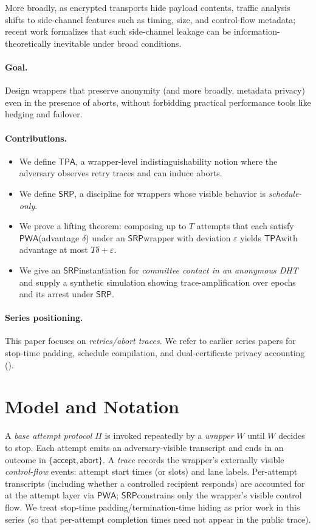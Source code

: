 \documentclass[11pt]{article}
\newcommand{\PWA}{\ensuremath{\mathsf{PWA}}}
\newcommand{\TPA}{\ensuremath{\mathsf{TPA}}}
\newcommand{\SRP}{\ensuremath{\mathsf{SRP}}}
\begin{document}
More broadly, as encrypted transports hide payload contents, traffic analysis shifts to side-channel features such as timing, size, and control-flow metadata; recent work formalizes that such side-channel leakage can be information-theoretically inevitable under broad conditions.\cite{liuInevitabilitySideChannel2026}

\paragraph{Goal.}
Design wrappers that preserve anonymity (and more broadly, metadata privacy) even in the presence of aborts,
without forbidding practical performance tools like hedging and failover.

\paragraph{Contributions.}
\begin{itemize}[leftmargin=*]
  \item We define \TPA, a wrapper-level indistinguishability notion where the adversary observes retry traces and can induce aborts.
  \item We define \SRP, a discipline for wrappers whose visible behavior is \emph{schedule-only}.
  \item We prove a lifting theorem: composing up to $T$ attempts that each satisfy \PWA (advantage $\delta$) under an \SRP wrapper with deviation $\varepsilon$ yields \TPA with advantage at most $T\delta+\varepsilon$.
  \item We give an \SRP instantiation for \emph{committee contact in an anonymous DHT} and supply a synthetic simulation
        showing trace-amplification over epochs and its arrest under \SRP.
\end{itemize}

\paragraph{Series positioning.}
This paper focuses on \emph{retries/abort traces}. We refer to earlier series papers for
stop-time padding, schedule compilation, and dual-certificate privacy accounting
(\cite{series:schedcompiler,series:prefixcapacities,series:knapsacktransport,series:stoptimeaddendum}).

\section{Model and Notation}
A \emph{base attempt protocol} $\Pi$ is invoked repeatedly by a \emph{wrapper} $W$ until $W$ decides to stop.
Each attempt emits an adversary-visible transcript and ends in an outcome in $\{\mathsf{accept},\mathsf{abort}\}$.
A \emph{trace} records the wrapper's externally visible \emph{control-flow} events: attempt start times (or slots) and lane labels.
Per-attempt transcripts (including whether a controlled recipient responds) are accounted for at the attempt layer via \PWA; \SRP constrains only the wrapper's visible control flow. We treat stop-time padding/termination-time hiding as prior work in this series (so that per-attempt completion times need not appear in the public trace).
\end{document}

